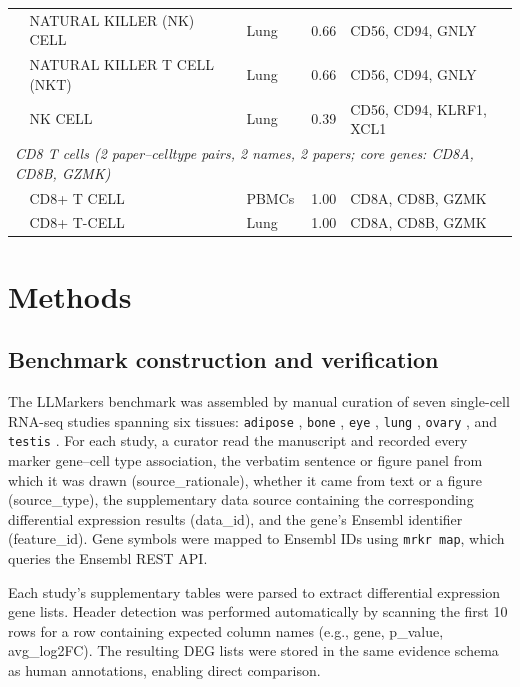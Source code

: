 \documentclass[10pt,twocolumn]{article}
\theoremstyle{plain}
\theoremstyle{definition}
\theoremstyle{remark}
\begin{document}
\begin{table}[ht!]
\begin{tabular}{@{}l l l r p{5.2cm}@{}}
  \citep{Duong2025}          & NATURAL KILLER (NK) CELL & Lung     & 0.66 & CD56, CD94, GNLY\\
  \citep{Duong2025}          & NATURAL KILLER T CELL (NKT) & Lung  & 0.66 & CD56, CD94, GNLY\\
  \citep{Kim2024immune}      & NK CELL                 & Lung      & 0.39 & CD56, CD94, KLRF1, XCL1\\
  \midrule
  \multicolumn{5}{l}{\textit{CD8 T cells (2 paper--celltype pairs, 2 names, 2 papers; core genes: CD8A, CD8B, GZMK)}} \\[2pt]
  \citep{Alkhadrawi2025}     & CD8+ T CELL             & PBMCs     & 1.00 & CD8A, CD8B, GZMK\\
  \citep{Liao2023}           & CD8+ T-CELL             & Lung      & 1.00 & CD8A, CD8B, GZMK\\
  \bottomrule
  \end{tabular}
\end{table}


\clearpage
\newpage
\section{Methods}

\subsection{Benchmark construction and verification}

The LLMarkers benchmark was assembled by manual curation of seven single-cell RNA-seq studies spanning six tissues: \texttt{adipose} \citep{Emont2022,Hildreth2021}, \texttt{bone} \citep{Zhong2020bone}, \texttt{eye} \citep{Gautam2021}, \texttt{lung} \citep{Adams2020}, \texttt{ovary} \citep{Wagner2020}, and \texttt{testis} \citep{Shamis2020}. For each study, a curator read the manuscript and recorded every marker gene--cell type association, the verbatim sentence or figure panel from which it was drawn (source\_rationale), whether it came from text or a figure (source\_type), the supplementary data source containing the corresponding differential expression results (data\_id), and the gene's Ensembl identifier (feature\_id). Gene symbols were mapped to Ensembl IDs using \texttt{mrkr map}, which queries the Ensembl REST API.

Each study's supplementary tables were parsed to extract differential expression gene lists. Header detection was performed automatically by scanning the first 10 rows for a row containing expected column names (e.g., gene, p\_value, avg\_log2FC). The resulting DEG lists were stored in the same evidence schema as human annotations, enabling direct comparison.
\end{document}
